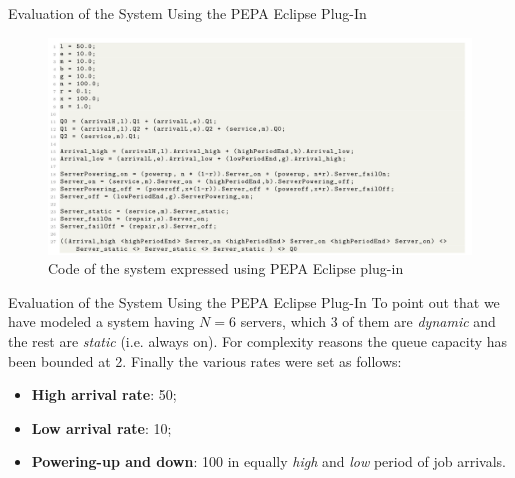 \documentclass[8pt]{beamer}
\begin{document}
    \begin{frame}{Evaluation of the System Using the PEPA Eclipse Plug-In}
        \begin{figure}[h]
            \centering
            \includegraphics[width=1.0\textwidth]{Images/pepa-plugin-code.png}
            \caption{Code of the system expressed using PEPA Eclipse plug-in}
            \label{fig:pepa-plugin-code}
        \end{figure} 
    \end{frame}

    \begin{frame}{Evaluation of the System Using the PEPA Eclipse Plug-In}
        To point out that we have modeled a system having \(N = 6\) servers, which 3 of them are \textit{dynamic} and the rest are \textit{static} (i.e. always on).\newline
        For complexity reasons the queue capacity has been bounded at 2.\newline\newline
        Finally the various rates were set as follows:
        \begin{itemize}
            \item \textbf{High arrival rate}: 50;
            \item \textbf{Low arrival rate}: 10;
            \item \textbf{Powering-up and down}: 100 in equally \textit{high} and \textit{low} period of job arrivals.
        \end{itemize}
    \end{frame}
\end{document}
